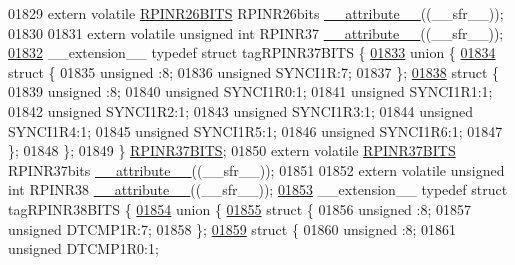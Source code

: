 \begin{DoxyCode}
01829 \textcolor{keyword}{extern} \textcolor{keyword}{volatile} \hyperlink{a00008_dc/d8f/a00718}{RPINR26BITS} RPINR26bits \hyperlink{a00009_a493c46f03454991ccc5aa7a6e1dfb2a7}{\_\_attribute\_\_}((\_\_sfr\_\_));
01830 
01831 \textcolor{keyword}{extern} \textcolor{keyword}{volatile} \textcolor{keywordtype}{unsigned} \textcolor{keywordtype}{int}  RPINR37 \hyperlink{a00009_a493c46f03454991ccc5aa7a6e1dfb2a7}{\_\_attribute\_\_}((\_\_sfr\_\_));
\hypertarget{a00009_source_l01832}{}\hyperlink{a00008}{01832} \_\_extension\_\_ \textcolor{keyword}{typedef} \textcolor{keyword}{struct }tagRPINR37BITS \{
\hypertarget{a00009_source_l01833}{}\hyperlink{a00009}{01833}   \textcolor{keyword}{union }\{
\hypertarget{a00009_source_l01834}{}\hyperlink{a00009}{01834}     \textcolor{keyword}{struct }\{
01835       \textcolor{keywordtype}{unsigned} :8;
01836       \textcolor{keywordtype}{unsigned} SYNCI1R:7;
01837     \};
\hypertarget{a00009_source_l01838}{}\hyperlink{a00009}{01838}     \textcolor{keyword}{struct }\{
01839       \textcolor{keywordtype}{unsigned} :8;
01840       \textcolor{keywordtype}{unsigned} SYNCI1R0:1;
01841       \textcolor{keywordtype}{unsigned} SYNCI1R1:1;
01842       \textcolor{keywordtype}{unsigned} SYNCI1R2:1;
01843       \textcolor{keywordtype}{unsigned} SYNCI1R3:1;
01844       \textcolor{keywordtype}{unsigned} SYNCI1R4:1;
01845       \textcolor{keywordtype}{unsigned} SYNCI1R5:1;
01846       \textcolor{keywordtype}{unsigned} SYNCI1R6:1;
01847     \};
01848   \};
01849 \} \hyperlink{a00008_dd/dc1/a00721}{RPINR37BITS};
01850 \textcolor{keyword}{extern} \textcolor{keyword}{volatile} \hyperlink{a00008_dd/dc1/a00721}{RPINR37BITS} RPINR37bits \hyperlink{a00009_a493c46f03454991ccc5aa7a6e1dfb2a7}{\_\_attribute\_\_}((\_\_sfr\_\_));
01851 
01852 \textcolor{keyword}{extern} \textcolor{keyword}{volatile} \textcolor{keywordtype}{unsigned} \textcolor{keywordtype}{int}  RPINR38 \hyperlink{a00009_a493c46f03454991ccc5aa7a6e1dfb2a7}{\_\_attribute\_\_}((\_\_sfr\_\_));
\hypertarget{a00009_source_l01853}{}\hyperlink{a00008}{01853} \_\_extension\_\_ \textcolor{keyword}{typedef} \textcolor{keyword}{struct }tagRPINR38BITS \{
\hypertarget{a00009_source_l01854}{}\hyperlink{a00009}{01854}   \textcolor{keyword}{union }\{
\hypertarget{a00009_source_l01855}{}\hyperlink{a00009}{01855}     \textcolor{keyword}{struct }\{
01856       \textcolor{keywordtype}{unsigned} :8;
01857       \textcolor{keywordtype}{unsigned} DTCMP1R:7;
01858     \};
\hypertarget{a00009_source_l01859}{}\hyperlink{a00009}{01859}     \textcolor{keyword}{struct }\{
01860       \textcolor{keywordtype}{unsigned} :8;
01861       \textcolor{keywordtype}{unsigned} DTCMP1R0:1;

\end{DoxyCode}
